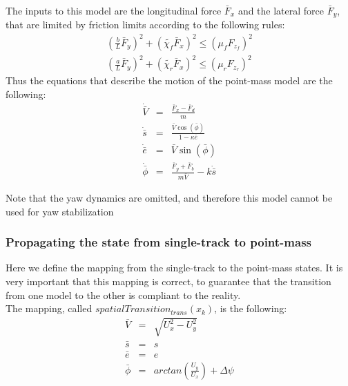 \documentclass[a4paper, onecolumn, 12pt]{article}
\begin{document}
The inputs to this model are the longitudinal force $\bar{F}_x$ and the lateral force $\bar{F}_y$, that are limited by friction limits
according to the following rules:
\begin{subequations}
    \begin{eqnarray} 
        \left(\frac{b}{L}\bar{F}_y\right)^2 + \left(\tilde{\chi_f}\bar{F}_x\right)^2 \leq \left(\mu_f F_{z_f}\right)^2 \\
        \left(\frac{a}{L}\bar{F}_y\right)^2 + \left(\tilde{\chi_r}\bar{F}_x\right)^2 \leq \left(\mu_r F_{z_r}\right)^2
    \end{eqnarray}
\end{subequations}
Thus the equations that describe the motion of the point-mass model are the following:
\begin{subequations}
    \begin{eqnarray}
        \dot{\bar{V}} &=& \frac{\bar{F}_{x}-\bar{F}_{d}}{m}\\
        \dot{\bar{s}} &=& \frac{\bar{V}\cos(\bar{\phi})}{1-\kappa \bar{e}}\\
        \dot{\bar{e}} &=& \bar{V}\sin(\bar{\phi})\\
        \dot{\bar{\phi}} &=& \frac{{\bar{F}}_y + {\bar{F}}_b}{m\bar{V}} - k\dot{\bar{s}}
    \end{eqnarray}
\end{subequations}

Note that the yaw dynamics are omitted, and therefore this model cannot be used for yaw stabilization

\subsubsection{Propagating the state from single-track to point-mass}
Here we define the mapping from the single-track to the point-mass states. 
It is very important that this mapping is correct, to guarantee that the transition
from one model to the other is compliant to the reality.\\
The mapping, called $spatialTransition_{trans}(x_k)$, is the following:
\begin{subequations}
    \begin{eqnarray}
        \bar{V} &=& \sqrt{U_{x}^{2}-U_{y}^{2}}\\
        \bar{s} &=& s\\
        \bar{e} &=& e\\
        \bar{\phi} &=& arctan\left(\frac{{U}_y}{{U}_x}\right) + \Delta\psi
    \end{eqnarray}
\end{subequations}
\end{document}
